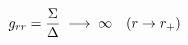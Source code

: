 \documentclass[preview]{standalone}
\begin{document}
\begin{align*}
\special{dvisvgm:raw <g id='unique000'>}g_{rr} = \frac{\Sigma}{\Delta} \;\longrightarrow\; \infty \quad (r \to r_+)\special{dvisvgm:raw </g>}
\end{align*}
\end{document}
